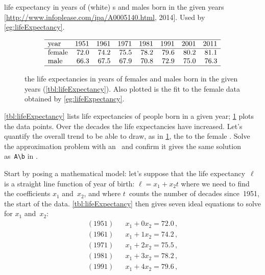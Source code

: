 \begin{example} \label{eg:lifeExpectancy}
\begin{table}
\caption{life expectancy in years of (white) s and males born in the given years  [\url{http://www.infoplease.com/ipa/A0005140.html}, 2014].  Used by \cref{eg:lifeExpectancy}.}
\label{tbl:lifeExpectancy}
\begin{equation*}
\begin{array}{lrrrrrrrr} \hline
\text{year}&1951&1961&1971&1981&1991&2001&2011\\\hline
\text{female}&72.0&74.2&75.5&78.2&79.6&80.2&81.1\\
\text{male}&66.3&67.5&67.9&70.8&72.9&75.0&76.3\\\hline
\end{array}
\end{equation*}
\end{table}
\begin{figure}
\centering

\caption{the life expectancies in years of females and males born in the given years (\cref{tbl:lifeExpectancy}).  
Also plotted is the  fit to the female data obtained by \cref{eg:lifeExpectancy}.}
\label{fig:lifeExpectancy}
\end{figure}
\cref{tbl:lifeExpectancy} lists life expectancies of people born in a given year; \cref{fig:lifeExpectancy} plots the data points.
Over the decades the life expectancies have increased.
Let's quantify the overall trend to be able to draw, as in 
\cref{fig:lifeExpectancy}, the  to the 
female .
Solve the approximation problem with an \svd\ and confirm it gives the same solution as~\verb|A\b| in \script.
\begin{solution} 
Start by posing a mathematical model: let's suppose that the life expectancy~\(\ell\) is a straight line function of year of birth: \(\ell=x_1+x_2t\) where we need to find the coefficients \(x_1\) and~\(x_2\), and where \(t\)~counts the number of decades since~1951, the start of the data.
\cref{tbl:lifeExpectancy} then gives seven ideal equations to solve for \(x_1\) and~\(x_2\):
\begin{eqnarray*}
(1951)&&x_1+0x_2=72.0\,,
\\(1961)&&x_1+1x_2=74.2\,,
\\(1971)&&x_1+2x_2=75.5\,,
\\(1981)&&x_1+3x_2=78.2\,,
\\(1991)&&x_1+4x_2=79.6\,,

\end{eqnarray*}
\end{solution}
\end{example}
